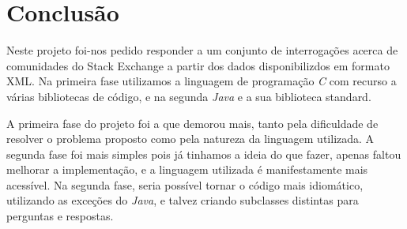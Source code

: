 \documentclass[10pt]{report}
\begin{document}
\chapter{Conclusão}

Neste projeto foi-nos pedido responder a um conjunto de interrogações acerca de comunidades do Stack Exchange a partir dos dados disponibilizdos em formato XML. Na primeira fase utilizamos a linguagem de programação \textit{C} com recurso a várias bibliotecas de código, e na segunda \textit{Java} e a sua biblioteca standard.

A primeira fase do projeto foi a que demorou mais, tanto pela dificuldade de resolver o problema proposto como pela natureza da linguagem utilizada. A segunda fase foi mais simples pois já tinhamos a ideia do que fazer, apenas faltou melhorar a implementação, e a linguagem utilizada é manifestamente mais acessível. Na segunda fase, seria possível tornar o código mais idiomático, utilizando as exceções do \textit{Java}, e talvez criando subclasses distintas para perguntas e respostas.

\label{sec:conclusao}
\end{document}
